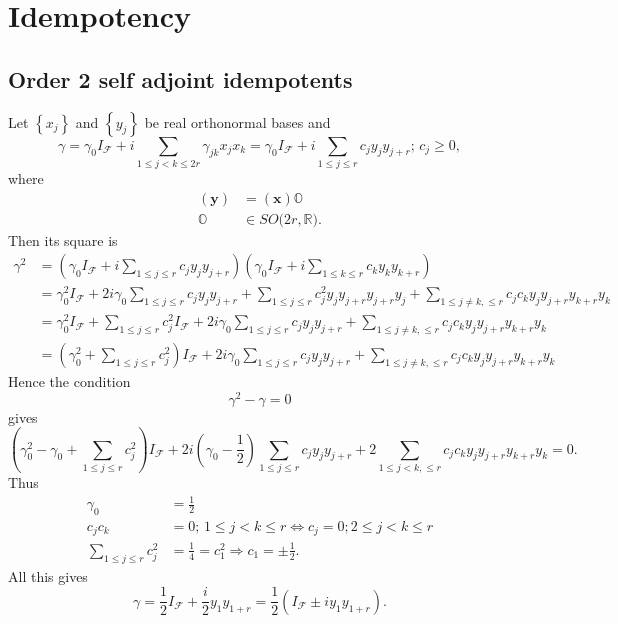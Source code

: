 \documentclass[aps,preprint]{revtex4}%
\begin{document}
\section{Idempotency}

\subsection{Order 2 self adjoint idempotents}

Let $\left\{  x_{j}\right\}  $ and $\left\{  y_{j}\right\}  $ be real
orthonormal bases and
\begin{equation}
\gamma=\gamma_{0}I_{\mathcal{F}}+i\sum_{1\leq j<k\leq2r}\gamma_{jk}x_{j}%
x_{k}=\gamma_{0}I_{\mathcal{F}}+i\sum_{1\leq j\leq r}c_{j}y_{j}y_{j+r}%
;\,c_{j}\geq0,
\end{equation}
where
\begin{align}
\left(  \mathbf{y}\right)   &  =\left(  \mathbf{x}\right)  \mathbb{O}\\
\mathbb{O}  &  \mathbb{\in}SO(2r,\mathbb{R)}.
\end{align}
Then its square is
\begin{align}
\gamma^{2}  &  =\left(  \gamma_{0}I_{\mathcal{F}}+i\sum_{1\leq j\leq r}%
c_{j}y_{j}y_{j+r}\right)  \left(  \gamma_{0}I_{\mathcal{F}}+i\sum_{1\leq k\leq
r}c_{k}y_{k}y_{k+r}\right) \\
&  =\gamma_{0}^{2}I_{\mathcal{F}}+2i\gamma_{0}\sum_{1\leq j\leq r}c_{j}%
y_{j}y_{j+r}+\sum_{1\leq j\leq r}c_{j}^{2}y_{j}y_{j+r}y_{j+r}y_{j}+\sum_{1\leq
j\neq k,\leq r}c_{j}c_{k}y_{j}y_{j+r}y_{k+r}y_{k}\\
&  =\gamma_{0}^{2}I_{\mathcal{F}}+\sum_{1\leq j\leq r}c_{j}^{2}I_{\mathcal{F}%
}+2i\gamma_{0}\sum_{1\leq j\leq r}c_{j}y_{j}y_{j+r}+\sum_{1\leq j\neq k,\leq
r}c_{j}c_{k}y_{j}y_{j+r}y_{k+r}y_{k}\\
&  =\left(  \gamma_{0}^{2}+\sum_{1\leq j\leq r}c_{j}^{2}\right)
I_{\mathcal{F}}+2i\gamma_{0}\sum_{1\leq j\leq r}c_{j}y_{j}y_{j+r}+\sum_{1\leq
j\neq k,\leq r}c_{j}c_{k}y_{j}y_{j+r}y_{k+r}y_{k}%
\end{align}
Hence the condition
\begin{equation}
\gamma^{2}-\gamma=0
\end{equation}
gives
\begin{equation}
\left(  \gamma_{0}^{2}-\gamma_{0}+\sum_{1\leq j\leq r}c_{j}^{2}\right)
I_{\mathcal{F}}+2i\left(  \gamma_{0}-\frac{1}{2}\right)  \sum_{1\leq j\leq
r}c_{j}y_{j}y_{j+r}+2\sum_{1\leq j<k,\leq r}c_{j}c_{k}y_{j}y_{j+r}y_{k+r}%
y_{k}=0.
\end{equation}
Thus
\begin{align}
\gamma_{0}  &  =\frac{1}{2}\\
c_{j}c_{k}  &  =0;\,1\leq j<k\leq r\Longleftrightarrow c_{j}=0;2\leq j<k\leq
r\\
\sum_{1\leq j\leq r}c_{j}^{2}  &  =\frac{1}{4}=c_{1}^{2}\Rightarrow c_{1}%
=\pm\frac{1}{2}.
\end{align}
All this gives
\begin{equation}
\gamma=\frac{1}{2}I_{\mathcal{F}}+\frac{i}{2}y_{1}y_{1+r}=\frac{1}{2}\left(
I_{\mathcal{F}}\pm iy_{1}y_{1+r}\right)  .
\end{equation}
\end{document}

